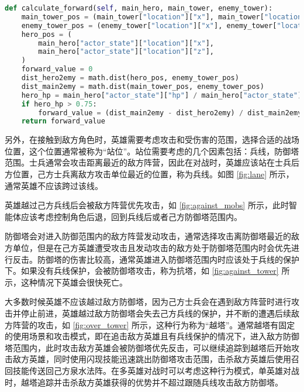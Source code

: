 \begin{lstlisting}[language=Python]
def calculate_forward(self, main_hero, main_tower, enemy_tower):
    main_tower_pos = (main_tower["location"]["x"], main_tower["location"]["z"])
    enemy_tower_pos = (enemy_tower["location"]["x"], enemy_tower["location"]["z"])
    hero_pos = (
        main_hero["actor_state"]["location"]["x"],
        main_hero["actor_state"]["location"]["z"],
    )
    forward_value = 0
    dist_hero2emy = math.dist(hero_pos, enemy_tower_pos)
    dist_main2emy = math.dist(main_tower_pos, enemy_tower_pos)
    hero_hp = main_hero["actor_state"]["hp"] / main_hero["actor_state"]["max_hp"]
    if hero_hp > 0.75:
        forward_value = (dist_main2emy - dist_hero2emy) / dist_main2emy
    return forward_value
\end{lstlisting}

另外，在接触到敌方角色时，英雄需要考虑攻击和受伤害的范围，选择合适的战场位置，这个位置通常被称为“站位”。站位需要考虑的几个因素包括：兵线，防御塔范围。士兵通常会攻击距离最近的敌方阵营，因此在对战时，英雄应该站在士兵后方位置，己方士兵离敌方攻击单位最近的位置，称为兵线。如图 \cref{fig:lane} 所示，通常英雄不应该跨过该线。

英雄越过己方兵线后会被敌方阵营优先攻击，如 \cref{fig:against_mobs} 所示，此时智能体应该考虑控制角色后退，回到兵线后或者己方防御塔范围内。

防御塔会对进入防御范围内的敌方阵营发动攻击，通常选择攻击离防御塔最近的敌方单位，但是在己方英雄遭受攻击且发动攻击的敌方处于防御塔范围内时会优先进行反击。防御塔的伤害比较高，通常英雄进入防御塔范围内时应该处于兵线的保护下。如果没有兵线保护，会被防御塔攻击，称为抗塔，如 \cref{fig:against_tower} 所示，这种情况下英雄会很快死亡。

大多数时候英雄不应该越过敌方防御塔，因为己方士兵会在遇到敌方阵营时进行攻击并停止前进，英雄越过敌方防御塔会失去己方兵线的保护，并不断的遭遇后续敌方阵营的攻击，如 \cref{fig:over_tower} 所示，这种行为称为“越塔”。通常越塔有固定的使用场景和攻击模式，即在追击敌方英雄且有兵线保护的情况下，进入敌方防御塔范围内，此时攻击敌方英雄会被防御塔优先反击，可以继续追踪到越塔后开始攻击敌方英雄，同时使用闪现技能迅速跳出防御塔攻击范围，击杀敌方英雄后使用召回技能传送回己方泉水法阵。在多英雄对战时可以考虑这种行为模式，单英雄对战时，越塔追踪并击杀敌方英雄获得的优势并不超过跟随兵线攻击敌方防御塔。


